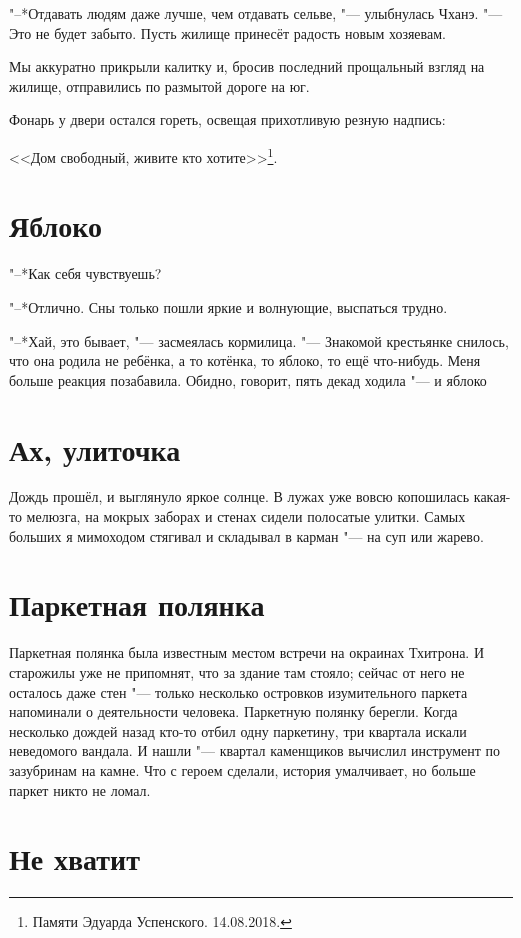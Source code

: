 \documentclass[a4paper,10pt]{book}
\newcommand{\ldotst}{\so{...}\xspace}
\begin{document}
"--*Отдавать людям даже лучше, чем отдавать сельве, "--- улыбнулась Чханэ. "--- Это не будет забыто. Пусть жилище принесёт радость новым хозяевам.

Мы аккуратно прикрыли калитку и, бросив последний прощальный взгляд на жилище, отправились по размытой дороге на юг.

Фонарь у двери остался гореть, освещая прихотливую резную надпись:

<<Дом свободный, живите кто хотите>>\footnote{Памяти Эдуарда Успенского. 14.08.2018.}.
 
 \section{Яблоко}

"--*Как себя чувствуешь?

"--*Отлично. Сны только пошли яркие и волнующие, выспаться трудно.

"--*Хай, это бывает, "--- засмеялась кормилица. "--- Знакомой крестьянке снилось, что она родила не ребёнка, а то котёнка, то яблоко, то ещё что-нибудь.
Меня больше реакция позабавила. Обидно, говорит, пять декад ходила "--- и яблоко\ldotst
 
 \section{Ах, улиточка}

 Дождь прошёл, и выглянуло яркое солнце. В лужах уже вовсю копошилась какая-то мелюзга, на мокрых заборах и стенах сидели полосатые улитки. Самых больших я мимоходом стягивал и складывал в карман "--- на суп или жарево.
 
\section{Паркетная полянка}
 
Паркетная полянка была известным местом встречи на окраинах Тхитрона. И старожилы уже не припомнят, что за здание там стояло; сейчас от него не осталось даже стен "--- только несколько островков изумительного паркета напоминали о деятельности человека. Паркетную полянку берегли. Когда несколько дождей назад кто-то отбил одну паркетину, три квартала
искали неведомого вандала. И нашли "--- квартал каменщиков вычислил инструмент по зазубринам на камне. Что с героем сделали, история умалчивает, но больше паркет никто не ломал.

 \section{Не хватит}
\end{document}
